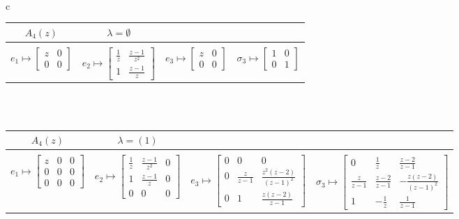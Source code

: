 \documentclass[11pt,a4paper,reqno,svgnames]{amsart}
\theoremstyle{plain}
\theoremstyle{definition}
\numberwithin{equation}{section}
\begin{document}
\begin{landscape}
\
\vfill 
\begin{table}[hhh]
\centering
\begin{tabular}{c}
 \begin{tabular}{cccc}
 \toprule
 $A_{4}(z)$ & $\lambda=\emptyset$\\
 \midrule\vspace{-01.5em}\\
 ${e}_{1}\mapsto\begin{bmatrix}z&0\\0&0\end{bmatrix}$ & ${e}_{2}\mapsto\begin{bmatrix}\frac{1}{z}&{\textstyle\frac{z-1}{z^2}} \\1&{\textstyle\frac{z-1}{z}}\end{bmatrix}$ &
 ${e}_{3}\mapsto\begin{bmatrix}z&0\\0&0\end{bmatrix}$ & ${\sigma}_{3}\mapsto\begin{bmatrix}1&0\\0&1\end{bmatrix}$\medskip\\
 \bottomrule
 \end{tabular}
\\
\\
 \begin{tabular}{cccc}
 \toprule
 $A_{4}(z)$& $\lambda=(1)$\\
 \midrule\vspace{-01.5em}\\ 
 ${e}_{1}\mapsto\begin{bmatrix}z&0&0\\0&0&0\\0&0&0\end{bmatrix}$ & ${e}_{2}\mapsto\begin{bmatrix}\frac{1}{z}&\frac{z-1}{z^2}&0 \\1&\frac{z-1}{z}&0\\ 0&0&0\end{bmatrix}$ & 
 ${e}_{3}\mapsto\begin{bmatrix}0&0&0\\0&\frac{z}{z-1}&\frac{z^2(z-2)}{(z-1)^2}\\ 0& 1& \frac{z(z-2)}{z-1}\end{bmatrix}$ 
 & ${\sigma}_{3}\mapsto\begin{bmatrix}0&\frac{1}{z}&\frac{z-2}{z-1}\\ 
 \frac{z}{z-1}& \frac{z-2}{z-1}&-\frac{z(z-2)}{(z-1)^2}\\
 1&-\frac{1}{z}&\frac{1}{z-1} \end{bmatrix}$\medskip\\
 \bottomrule
\end{tabular}


\end{tabular}
\end{table}
\end{landscape}
\end{document}
